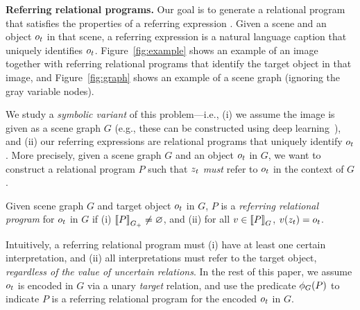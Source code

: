 \textbf{Referring relational programs.}
%
Our goal is to generate a relational program that satisfies the properties of a referring expression \cite{golland2010game,kazemzadeh2014referitgame}. Given a scene and an object $o_{t}$ in that scene, a referring expression is a natural language caption that uniquely identifies $o_{t}$. Figure~\ref{fig:example} shows an example of an image together with referring relational programs that identify the target object in that image, and Figure~\ref{fig:graph} shows an example of a scene graph (ignoring the gray variable nodes).

We study a \emph{symbolic variant} of this problem---i.e., (i) we assume the image is given as a scene graph $G$ (e.g., these can be constructed using deep learning~\cite{redmon2016you,krishna2017visual,yi2018neural,mao2019neuro}), and (ii) our referring expressions are relational programs that uniquely identify $o_{t}$. More precisely, given a scene graph $G$ and an object $o_{t}$ in $G$, we want to construct a relational program $P$ such that $z_{t}$ \emph{must} refer to $o_{t}$ in the context of $G$.

\begin{definition}\label{def:refexpr}
\rm
Given scene graph $G$ and target object $o_{t}$ in $G$, $P$ is a \emph{referring relational program} for $o_{t}$ in $G$ if (i) $\left\llbracket P \right\rrbracket_{G_+}\neq\varnothing$, and (ii) for all $v \in \left\llbracket P \right\rrbracket_G$, $v(z_{t}) = o_{t}$.
\end{definition}

Intuitively, a referring relational program must (i) have at least one certain interpretation, and (ii) all interpretations must refer to the target object, \emph{regardless of the value of uncertain relations}. In the rest of this paper, we assume $o_{t}$ is encoded in $G$ via a unary \emph{target} relation, and use the predicate $\phi_{G}(P)$ to indicate $P$ is a referring relational program for the encoded $o_{t}$ in $G$.
